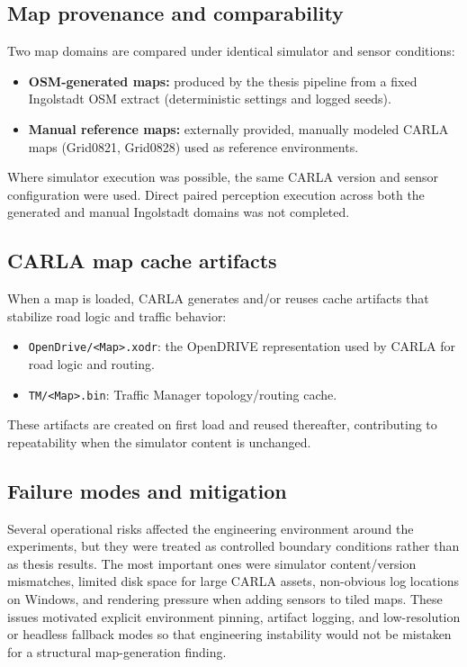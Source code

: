 \subsection{Map provenance and comparability}
\label{sec:map_provenance}
Two map domains are compared under identical simulator and sensor conditions:
\begin{itemize}
    \item \textbf{OSM-generated maps:} produced by the thesis pipeline from a fixed Ingolstadt OSM extract (deterministic settings and logged seeds).
    \item \textbf{Manual reference maps:} externally provided, manually modeled CARLA maps (Grid0821, Grid0828) used as reference environments.
\end{itemize}
Where simulator execution was possible, the same CARLA version and sensor configuration were used. Direct paired perception execution across both the generated and manual Ingolstadt domains was not completed.


\subsection{CARLA map cache artifacts}
\label{sec:carla_cache}
When a map is loaded, CARLA generates and/or reuses cache artifacts that stabilize road logic and traffic behavior:
\begin{itemize}
    \item \texttt{OpenDrive/<Map>.xodr}: the OpenDRIVE representation used by CARLA for road logic and routing.
    \item \texttt{TM/<Map>.bin}: Traffic Manager topology/routing cache.
\end{itemize}
These artifacts are created on first load and reused thereafter, contributing to repeatability when the simulator content is unchanged.


\subsection{Failure modes and mitigation}
\label{sec:failure_modes}
Several operational risks affected the engineering environment around the experiments,
but they were treated as controlled boundary conditions rather than as thesis results.
The most important ones were simulator content/version mismatches, limited disk space for
large CARLA assets, non-obvious log locations on Windows, and rendering pressure when
adding sensors to tiled maps. These issues motivated explicit environment pinning, artifact
logging, and low-resolution or headless fallback modes so that engineering instability would
not be mistaken for a structural map-generation finding.

